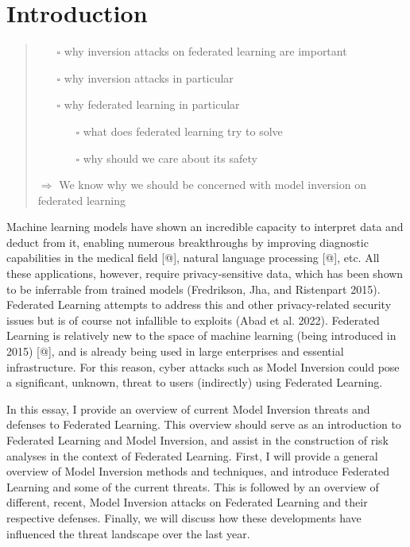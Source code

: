 \hypertarget{introduction}{%
\section{Introduction}\label{introduction}}

\begin{quote}
\begin{itemize}
\tightlist
\item[$\square$]
  why inversion attacks on federated learning are important
\item[$\square$]
  why inversion attacks in particular
\item[$\square$]
  why federated learning in particular

  \begin{itemize}
  \tightlist
  \item[$\square$]
    what does federated learning try to solve
  \item[$\square$]
    why should we care about its safety
  \end{itemize}
\end{itemize}

\(\Rightarrow\) We know why we should be concerned with model inversion
on federated learning
\end{quote}

Machine learning models have shown an incredible capacity to interpret
data and deduct from it, enabling numerous breakthroughs by improving
diagnostic capabilities in the medical field {[}@{]}, natural language
processing {[}@{]}, etc. All these applications, however, require
privacy-sensitive data, which has been shown to be inferrable from
trained models (Fredrikson, Jha, and Ristenpart 2015). Federated
Learning attempts to address this and other privacy-related security
issues but is of course not infallible to exploits (Abad et al. 2022).
Federated Learning is relatively new to the space of machine learning
(being introduced in 2015) {[}@{]}, and is already being used in large
enterprises and essential infrastructure. For this reason, cyber attacks
such as Model Inversion could pose a significant, unknown, threat to
users (indirectly) using Federated Learning.

In this essay, I provide an overview of current Model Inversion threats
and defenses to Federated Learning. This overview should serve as an
introduction to Federated Learning and Model Inversion, and assist in
the construction of risk analyses in the context of Federated Learning.
First, I will provide a general overview of Model Inversion methods and
techniques, and introduce Federated Learning and some of the current
threats. This is followed by an overview of different, recent, Model
Inversion attacks on Federated Learning and their respective defenses.
Finally, we will discuss how these developments have influenced the
threat landscape over the last year.

